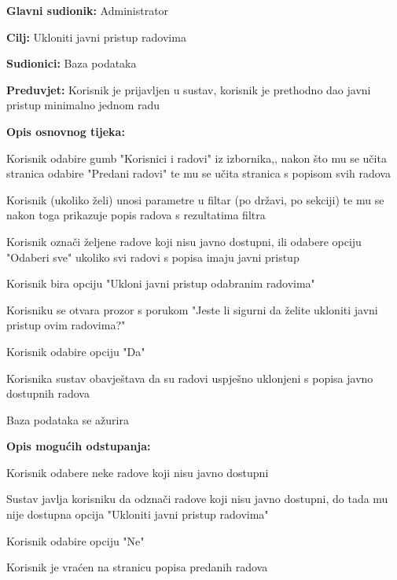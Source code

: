 					\noindent {}
					\begin{packed_item}
						\item \textbf{Glavni sudionik:} Administrator
						\item \textbf{Cilj:} Ukloniti javni pristup radovima
						\item \textbf{Sudionici:} Baza podataka
						\item \textbf{Preduvjet:} Korisnik je prijavljen u sustav, korisnik je prethodno dao javni pristup minimalno jednom radu
						
						\item \textbf{Opis osnovnog tijeka:} 
						\item[] \begin{packed_enum}
							\item Korisnik odabire gumb "Korisnici i radovi" iz izbornika,, nakon što mu se učita stranica odabire "Predani radovi" te mu se učita stranica s popisom svih radova
							\item Korisnik (ukoliko želi) unosi parametre u filtar (po državi, po sekciji) te mu se nakon toga prikazuje popis radova s rezultatima filtra
							\item Korisnik označi željene radove koji nisu javno dostupni, ili odabere opciju "Odaberi sve" ukoliko svi radovi s popisa imaju javni pristup
							\item Korisnik bira opciju "Ukloni javni pristup odabranim radovima"
							\item Korisniku se otvara prozor s porukom "Jeste li sigurni da želite ukloniti javni pristup ovim radovima?"
							\item Korisnik odabire opciju "Da"
							\item Korisnika sustav obavještava da su radovi uspješno uklonjeni s popisa javno dostupnih radova
							\item Baza podataka se ažurira
						\end{packed_enum}
					
						\item \textbf{Opis mogućih odstupanja:}
						\item[] \begin{packed_enum}
							\item[1.a] Korisnik odabere neke radove koji nisu javno dostupni
							\item[] \begin{packed_enum}
								\item[1.] Sustav javlja korisniku da odznači radove koji nisu javno dostupni, do tada mu nije dostupna opcija "Ukloniti javni pristup radovima"

							\end{packed_enum}
							\item[4.a] Korisnik odabire opciju "Ne"
							\item[] \begin{packed_enum}
								\item[1.] Korisnik je vraćen na stranicu popisa predanih radova
							\end{packed_enum} 
						\end{packed_enum}
					\end{packed_item}

